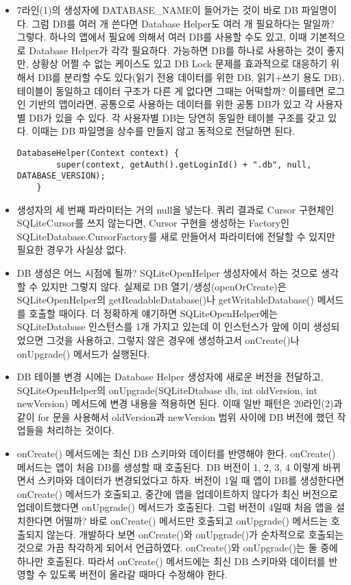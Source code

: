 \begin{itemize}
\item 7라인(1)의 생성자에 DATABASE\_NAME이 들어가는 것이 바로 DB 파일명이다.
그럼 DB를 여러 개 쓴다면 Database Helper도 여러 개 필요하다는 말일까? 그렇다. 
하나의 앱에서 필요에 의해서 여러 DB를 사용할 수도 있고, 이때 기본적으로 Database Helper가 각각 필요하다.
가능하면 DB를 하나로 사용하는 것이 좋지만, 상황상 어쩔 수 없는 케이스도 있고 DB Lock 문제를 효과적으로 대응하기 위해서 DB를 분리할 수도 있다(읽기 전용 데이터를 위한 DB, 읽기+쓰기 용도 DB).\\

테이블이 동일하고 데이터 구조가 다른 게 없다면 그때는 어떡할까? 
이를테면 로그인 기반의 앱이라면, 공통으로 사용하는 데이터를 위한 공통 DB가 있고 각 사용자별 DB가 있을 수 있다. 
각 사용자별 DB는 당연히 동일한 테이블 구조를 갖고 있다. 이때는 DB 파일명을 상수를 만들지 않고 동적으로 전달하면 된다.
\begin{lstlisting}[frame=single] 
    DatabaseHelper(Context context) {
        super(context, getAuth().getLoginId() + ".db", null, DATABASE_VERSION);
    }
\end{lstlisting}

\item 생성자의 세 번째 파라미터는 거의 null을 넣는다. 
쿼리 결과로 Cursor 구현체인 SQLiteCursor를 쓰지 않는다면, Cursor 구현을 생성하는 Factory인 
SQLiteDatabase.CursorFactory를 새로 만들어서 파라미터에 전달할 수 있지만 필요한 경우가 사실상 없다.

\item DB 생성은 어느 시점에 될까? SQLiteOpenHelper 생성자에서 하는 것으로 생각할 수 있지만 그렇지 않다.
실제로 DB 열기/생성(openOrCreate)은 SQLiteOpenHelper의 getReadableDatabase()나 getWritableDatabase() 메서드를 호출할 때이다.
더 정확하게 얘기하면 SQLiteOpenHelper에는 SQLiteDatabase 인스턴스를 1개 가지고 있는데 이 인스턴스가 앞에 이미 생성되었으면 그것을 사용하고, 그렇지 않은 경우에 생성하고서 onCreate()나 onUpgrade() 메서드가 실행된다.

\item DB 테이블 변경 시에는 Database Helper 생성자에 새로운 버전을 전달하고, 
SQLiteOpenHelper의 onUpgrade(SQLiteDtabase db, int oldVersion, int newVersion) 메서드에 변경 내용을 적용하면 된다. 
이때 일반 패턴은 20라인(2)과 같이 for 문을 사용해서 oldVersion과 newVersion 범위 사이에 DB 버전에 했던 작업들을 처리하는 것이다.

\item onCreate() 메서드에는 최신 DB 스키마와 데이터를 반영해야 한다. 
onCreate() 메서드는 앱이 처음 DB를 생성할 때 호출된다. DB 버전이 1, 2, 3, 4 이렇게 바뀌면서 스키마와 데이터가 변경되었다고 하자. 
버전이 1일 때 앱이 DB를 생성한다면 onCreate() 메서드가 호출되고, 중간에 앱을 업데이트하지 않다가 최신 버전으로 업데이트했다면 onUpgrade() 메서드가 호출된다.
그럼 버전이 4일때 처음 앱을 설치한다면 어떨까? 바로 onCreate() 메서드만 호출되고 onUpgrade() 메서드는 호출되지 않는다. 
개발하다 보면 onCreate()와 onUpgrade()가 순차적으로 호출되는 것으로 가끔 착각하게 되어서 언급하였다. onCreate()와 onUpgrade()는 둘 중에 하나만 호출된다.
따라서 onCreate() 메서드에는 최신 DB 스키마와 데이터를 반영할 수 있도록 버전이 올라갈 때마다 수정해야 한다.


\end{itemize}
